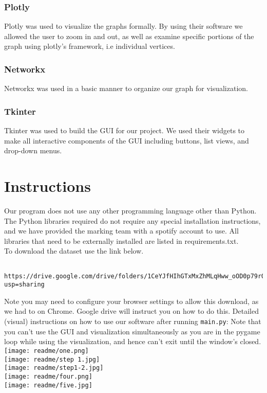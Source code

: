 \documentclass[fontsize=11pt]{article}
\begin{document}
    \subsubsection*{Plotly}
    Plotly was used to visualize the graphs formally. By using their software we allowed the user to zoom in and out, as well as examine specific portions of the graph using plotly's framework, i.e individual vertices.

    \subsubsection*{Networkx}
    Networkx was used in a basic manner to organize our graph for visualization.

    \subsubsection*{Tkinter}
    Tkinter was used to build the GUI for our project. We used their widgets to make all interactive components of the GUI including buttons, list views, and drop-down menus.


    \section*{Instructions}
    Our program does not use any other programming language other than Python. The Python libraries required do not require any special installation instructions, and we have provided the marking team with a spotify account to use. All libraries that need to be externally installed are listed in requirements.txt. \\
    \noindent To download the dataset use the link below.
    \begin{verbatim}
    https://drive.google.com/drive/folders/1CeYJfHIhGTxMxZhMLqHww_oOD0p79rOb?usp=sharing
    \end{verbatim}
    Note you may need to configure your browser settings to allow this download, as we had to on Chrome. Google drive will instruct you on how to do this.
    Detailed (visual) instructions on how to use our software after running \texttt{main.py}:
    Note that you can't use the GUI and visualization simultaneously as you are in the pygame loop while using the visualization, and hence can't exit until the window's closed. \\

    \texttt{[image: readme/one.png]}\\
    \texttt{[image: readme/step 1.jpg]} \\
    \texttt{[image: readme/step1-2.jpg]}\\
    \texttt{[image: readme/four.png]}\\
    \texttt{[image: readme/five.jpg]}\\
\end{document}

